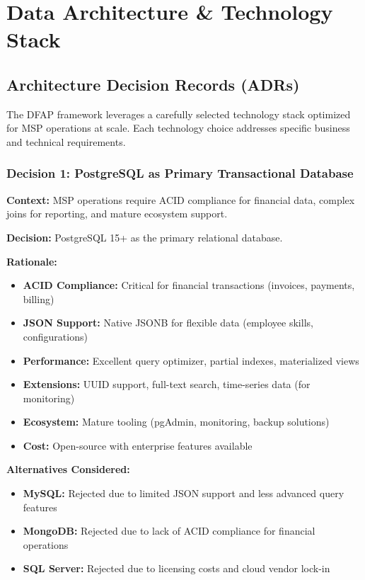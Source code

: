\section{Data Architecture \& Technology Stack}

\subsection{Architecture Decision Records (ADRs)}

The DFAP framework leverages a carefully selected technology stack optimized for MSP operations at scale. Each technology choice addresses specific business and technical requirements.

\subsubsection{Decision 1: PostgreSQL as Primary Transactional Database}

\textbf{Context:} MSP operations require ACID compliance for financial data, complex joins for reporting, and mature ecosystem support.

\textbf{Decision:} PostgreSQL 15+ as the primary relational database.

\textbf{Rationale:}
\begin{itemize}
  \item \textbf{ACID Compliance:} Critical for financial transactions (invoices, payments, billing)
  \item \textbf{JSON Support:} Native JSONB for flexible data (employee skills, configurations)
  \item \textbf{Performance:} Excellent query optimizer, partial indexes, materialized views
  \item \textbf{Extensions:} UUID support, full-text search, time-series data (for monitoring)
  \item \textbf{Ecosystem:} Mature tooling (pgAdmin, monitoring, backup solutions)
  \item \textbf{Cost:} Open-source with enterprise features available
\end{itemize}

\textbf{Alternatives Considered:}
\begin{itemize}
  \item \textbf{MySQL:} Rejected due to limited JSON support and less advanced query features
  \item \textbf{MongoDB:} Rejected due to lack of ACID compliance for financial operations
  \item \textbf{SQL Server:} Rejected due to licensing costs and cloud vendor lock-in
\end{itemize}

